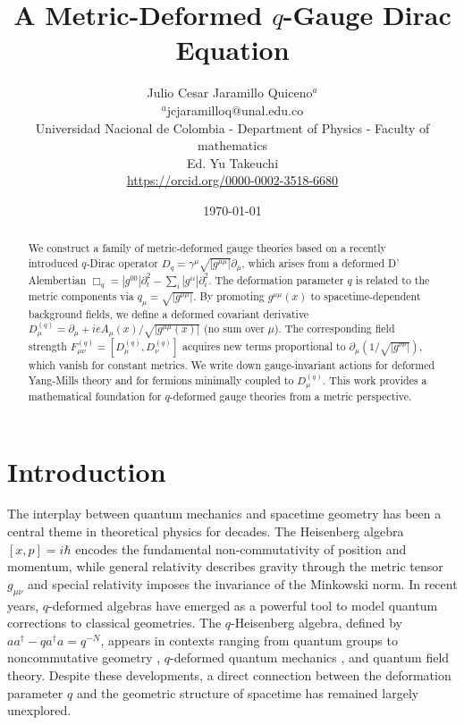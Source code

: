 \documentclass[12pt,a4paper]{article}
\title{A Metric-Deformed $q$-Gauge Dirac Equation}
\author{Julio Cesar Jaramillo Quiceno$^a$\\		
$^a$jcjaramilloq@unal.edu.co\\Universidad Nacional de Colombia - Department of Physics - Faculty of mathematics\\
Ed. Yu Takeuchi \\\url{https://orcid.org/0000-0002-3518-6680}}
\date{\today}
\theoremstyle{plain}
\theoremstyle{definition}
\begin{document}
\maketitle

\begin{abstract}
We construct a family of metric-deformed gauge theories based on a recently introduced $q$-Dirac operator $D_q = \gamma^\mu \sqrt{|g^{\mu\mu}|}\partial_\mu$, which arises from a deformed D' Alembertian $\Box_q = |g^{00}|\partial_t^2 - \sum_i |g^{ii}|\partial_i^2$. The deformation parameter $q$ is related to the metric components via $q_\mu = \sqrt{|g^{\mu\mu}|}$. By promoting $g^{\mu\mu}(x)$ to spacetime-dependent background fields, we define a deformed covariant derivative $D_\mu^{(q)} = \partial_\mu + ieA_\mu(x)/\sqrt{|g^{\mu\mu}(x)|}$ (no sum over $\mu$). The corresponding field strength $F_{\mu\nu}^{(q)} = [D_\mu^{(q)}, D_\nu^{(q)}]$ acquires new terms proportional to $\partial_\mu(1/\sqrt{|g^{\nu\nu}|})$, which vanish for constant metrics. We write down gauge-invariant actions for deformed Yang-Mills theory and for fermions minimally coupled to $D_\mu^{(q)}$. This work provides a mathematical foundation for $q$-deformed gauge theories from a metric perspective.
\end{abstract}

\section{Introduction}
\label{sec:intro}

The interplay between quantum mechanics and spacetime geometry has been a central theme in theoretical physics for decades. The Heisenberg algebra \([x,p]=i\hbar\) encodes the fundamental non‑commutativity of position and momentum, while general relativity describes gravity through the metric tensor \(g_{\mu\nu}\) and special relativity imposes the invariance of the Minkowski norm. In recent years, \(q\)-deformed algebras have emerged as a powerful tool to model quantum corrections to classical geometries. The \(q\)-Heisenberg algebra, defined by \(aa^{\dagger}-qa^{\dagger}a=q^{-N}\), appears in contexts ranging from quantum groups \cite{Wess2000} to noncommutative geometry \cite{Connes1994}, \(q\)-deformed quantum mechanics \cite{Lavagno2009}, and quantum field theory. Despite these developments, a direct connection between the deformation parameter \(q\) and the geometric structure of spacetime has remained largely unexplored.
\end{document}
